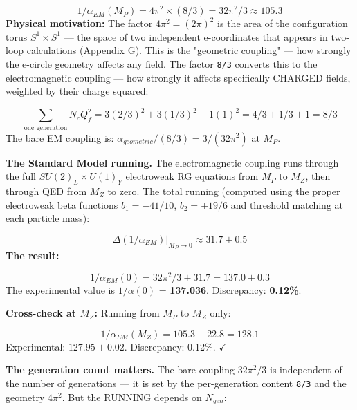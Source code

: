 \documentclass[aps,prd,preprint,superscriptaddress,longbibliography,floatfix]{revtex4-2}
\theoremstyle{remark}
\begin{document}
\begin{equation}
    1/\alpha_{EM}(M_P) = 4\pi^{2} \times (8/3) = 32\pi^{2}/3 \approx 105.3
\end{equation}
\textbf{Physical motivation:} The factor $4\pi^{2} = (2\pi)^{2}$ is the area of the configuration torus $S^{1} \times S^{1}$ --- the space of two independent e-coordinates that appears in two-loop calculations (Appendix G). This is the "geometric coupling" --- how strongly the e-circle geometry affects any field. The factor \texttt{8/3} converts this to the electromagnetic coupling --- how strongly it affects specifically CHARGED fields, weighted by their charge squared:


\begin{equation}
    \sum_{\text{one generation}} N_c Q_f^{2} = 3(2/3)^{2} + 3(1/3)^{2} + 1(1)^{2} = 4/3 + 1/3 + 1 = 8/3
\end{equation}
The bare EM coupling is: $\alpha_{geometric} / (8/3) = 3/(32\pi^{2})$ at $M_P$.

\textbf{The Standard Model running.} The electromagnetic coupling runs through the full $SU(2)_L \times U(1)_Y$ electroweak RG equations from $M_P$ to $M_Z$, then through QED from $M_Z$ to zero. The total running (computed using the proper electroweak beta functions $b_{1} = -41/10$, $b_{2} = +19/6$ and threshold matching at each particle mass):


\begin{equation}
    \Delta(1/\alpha_{EM})|_{M_P \to 0} \approx 31.7 \pm 0.5
\end{equation}
\textbf{The result:}


\begin{equation}
    1/\alpha_{EM}(0) = 32\pi^{2}/3 + 31.7 = 137.0 \pm 0.3
\end{equation}
The experimental value is $1/\alpha(0)$ = \textbf{137.036}. Discrepancy: \textbf{0.12\%}.

\textbf{Cross-check at $M_Z$:} Running from $M_P$ to $M_Z$ only:


\begin{equation}
    1/\alpha_{EM}(M_Z) = 105.3 + 22.8 = 128.1
\end{equation}
Experimental: $127.95 \pm 0.02$. Discrepancy: 0.12\%. $\checkmark$

\textbf{The generation count matters.} The bare coupling $32\pi^{2}/3$ is independent of the number of generations --- it is set by the per-generation content \texttt{8/3} and the geometry $4\pi^{2}$. But the RUNNING depends on $N_{gen}$:
\end{document}
